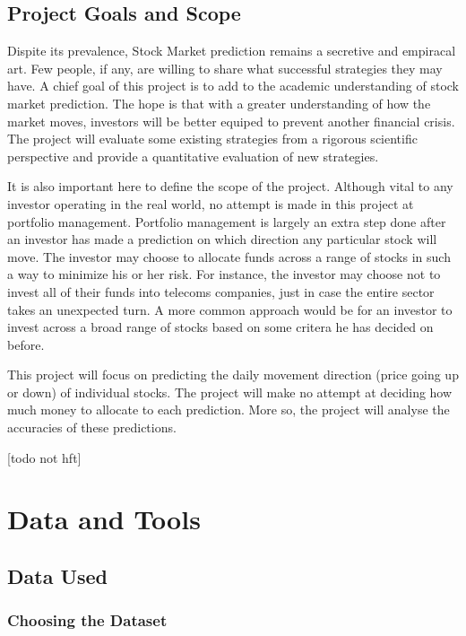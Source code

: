 \documentclass{report}
\begin{document}
\section{Project Goals and Scope}

Dispite its prevalence, Stock Market prediction remains a secretive and empiracal art. Few people, if any, are willing to share what  successful strategies they may have. A chief goal of this project is to add to the academic understanding of stock market prediction. The hope is that with a greater understanding of how the market moves, investors will be better equiped to prevent another financial crisis. The project will evaluate some existing strategies from a rigorous scientific perspective and provide a quantitative evaluation of new strategies. 

It is also important here to define the scope of the project. Although vital to any investor operating in the real world, no attempt is made in this project at portfolio management. Portfolio management is largely an extra step done after an investor has made a prediction on which direction any particular stock will move. The investor may choose to allocate funds across a range of stocks in such a way to minimize his or her risk. For instance, the investor may choose not to invest all of their funds into telecoms companies, just in case the entire sector takes an unexpected turn. A more common approach would be for an investor to invest across a broad range of stocks based on some critera he has decided on before. 

This project will focus on predicting the daily movement direction (price going up or down) of individual stocks. The project will make no attempt at deciding how much money to allocate to each prediction.  More so, the project will analyse the accuracies of these predictions. 

[todo not hft]

\chapter{Data and Tools}

\section{Data Used}

\subsection{Choosing the Dataset}
\end{document}
